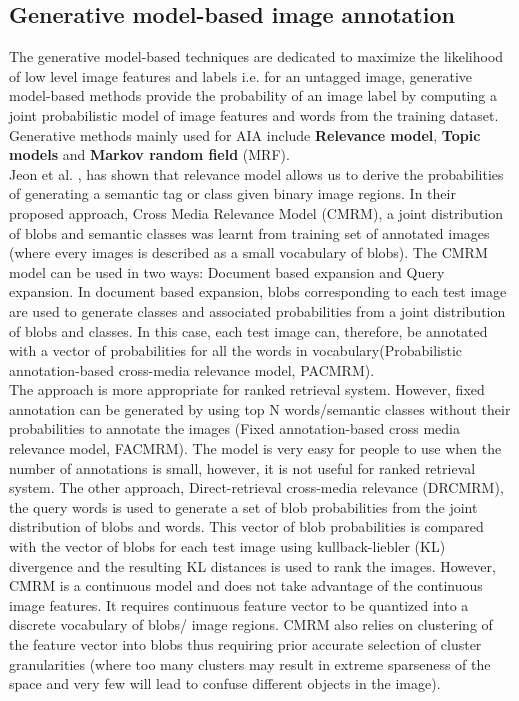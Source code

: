 \documentclass[conference]{IEEEtran}
\begin{document}
	\subsection{Generative model-based image annotation}
	
		The generative model-based techniques are dedicated to maximize the likelihood of low
level image features and labels i.e. for an untagged image, generative model-based methods
provide the probability of an image label by computing a joint probabilistic model of image
features and words from the training dataset. Generative methods mainly used for AIA
include \textbf{Relevance model}, \textbf{Topic models} and \textbf{Markov random field} (MRF).\\
		
		Jeon et al. \cite{b3}, has shown that relevance model allows us to derive the probabilities of
generating a semantic tag or class given binary image regions. In their proposed approach,
Cross Media Relevance Model (CMRM), a joint distribution of blobs and semantic classes
was learnt from training set of annotated images (where every images is described as a
small vocabulary of blobs). The CMRM model can be used in two ways: Document based
expansion and Query expansion. In document based expansion, blobs corresponding
to each test image are used to generate classes and associated probabilities from a joint
distribution of blobs and classes. In this case, each test image can, therefore, be annotated
with a vector of probabilities for all the words in vocabulary(Probabilistic annotation-based
cross-media relevance model, PACMRM).\\ 
		
		The approach is more appropriate for ranked
retrieval system. However, fixed annotation can be generated by using top N words/semantic
classes without their probabilities to annotate the images (Fixed annotation-based cross media relevance model, FACMRM). The model is very easy for people to use when the
number of annotations is small, however, it is not useful for ranked retrieval system. The
other approach, Direct-retrieval cross-media relevance (DRCMRM), the query words is
used to generate a set of blob probabilities from the joint distribution of blobs and words.
This vector of blob probabilities is compared with the vector of blobs for each test image
using kullback-liebler (KL) divergence and the resulting KL distances is used to rank
the images. However, CMRM is a continuous model and does not take advantage of the
continuous image features. It requires continuous feature vector to be quantized into a
discrete vocabulary of blobs/ image regions. CMRM also relies on clustering of the feature
vector into blobs thus requiring prior accurate selection of cluster granularities (where too
many clusters may result in extreme sparseness of the space and very few will lead to confuse
different objects in the image).\\
		
\end{document}
